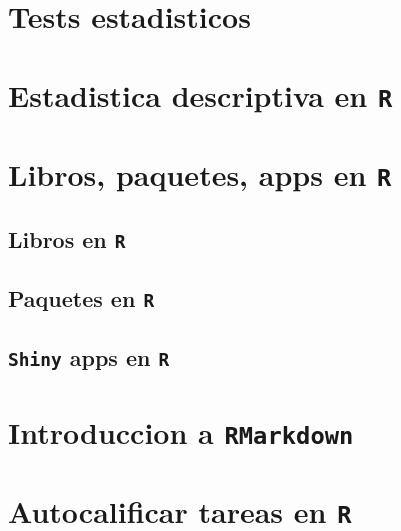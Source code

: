 \documentclass[
]{book}
\begin{document}
\hypertarget{tests-estadisticos}{%
\chapter{Tests estadisticos}\label{tests-estadisticos}}

\hypertarget{estadistica-descriptiva-en-r}{%
\chapter{\texorpdfstring{Estadistica descriptiva en \texttt{R}}{Estadistica descriptiva en R}}\label{estadistica-descriptiva-en-r}}

\hypertarget{libros-paquetes-apps-en-r}{%
\chapter{\texorpdfstring{Libros, paquetes, apps en \texttt{R}}{Libros, paquetes, apps en R}}\label{libros-paquetes-apps-en-r}}

\hypertarget{libros-en-r}{%
\section{\texorpdfstring{Libros en \texttt{R}}{Libros en R}}\label{libros-en-r}}

\hypertarget{paquetes-en-r}{%
\section{\texorpdfstring{Paquetes en \texttt{R}}{Paquetes en R}}\label{paquetes-en-r}}

\hypertarget{shiny-apps-en-r}{%
\section{\texorpdfstring{\texttt{Shiny} apps en \texttt{R}}{Shiny apps en R}}\label{shiny-apps-en-r}}

\hypertarget{introduccion-a-rmarkdown}{%
\chapter{\texorpdfstring{Introduccion a \texttt{RMarkdown}}{Introduccion a RMarkdown}}\label{introduccion-a-rmarkdown}}

\hypertarget{autocalificar-tareas-en-r}{%
\chapter{\texorpdfstring{Autocalificar tareas en \texttt{R}}{Autocalificar tareas en R}}\label{autocalificar-tareas-en-r}}
\end{document}
